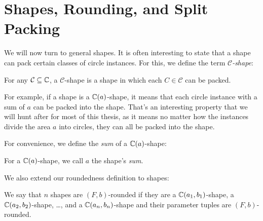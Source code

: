 \section{Shapes, Rounding, and Split Packing}

We will now turn to general shapes. It is often interesting to state that a shape can pack certain classes of circle instances. For this, we define the term \emph{$\mathcal{C}$-shape}:

\begin{definition}
    For any $\mathcal{C} \subseteq \mathbb{C}$, a $\mathcal{C}$-shape is a shape in which each $C \in \mathcal{C}$ can be packed.
\end{definition}

For example, if a shape is a $\mathbb{C}(a)$-shape, it means that each circle instance with a sum of $a$ can be packed into the shape. That's an interesting property that we will hunt after for most of this thesis, as it means no matter how the instances divide the area $a$ into circles, they can all be packed into the shape.

For convenience, we define the \emph{sum} of a $\mathbb{C}(a)$-shape:

\begin{definition}
    For a $\mathbb{C}(a)$-shape, we call $a$ the shape's \emph{sum}.
\end{definition}

We also extend our roundedness definition to shapes:

\begin{definition}
    We say that $n$ shapes are $(F,b)$-rounded if they are a $\mathbb{C}(a_1, b_1)$-shape, a $\mathbb{C}(a_2, b_2)$-shape, \dots, and a $\mathbb{C}(a_n, b_n)$-shape and their parameter tuples are $(F,b)$-rounded.
\end{definition}



